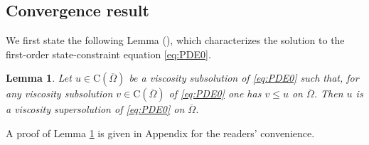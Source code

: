 \documentclass[12pt,reqno]{amsart}
\numberwithin{figure}{section}
\theoremstyle{plain}
\newtheorem{lem}[thm]{Lemma}
\theoremstyle{remark}
\numberwithin{equation}{section}
\newcommand{\rmC}{\mathrm{C}}
\begin{document}
\subsection{Convergence result} We first state the following Lemma (\cite{Capuzzo-Dolcetta1990}), which characterizes the solution to the first-order state-constraint  equation \eqref{eq:PDE0}.
\begin{lem}\label{lem:max} Let $u\in \rmC(\overline{\Omega})$ be a viscosity subsolution of \eqref{eq:PDE0} such that, for any viscosity subsolution $v\in \rmC(\overline{\Omega})$ of \eqref{eq:PDE0} one has $v\leq u$ on $\overline{\Omega}$. Then $u$ is a viscosity supersolution of \eqref{eq:PDE0} on $\overline{\Omega}$.
\end{lem}
\noindent A proof of Lemma \ref{lem:max} is given in Appendix for the readers' convenience.
\end{document}
